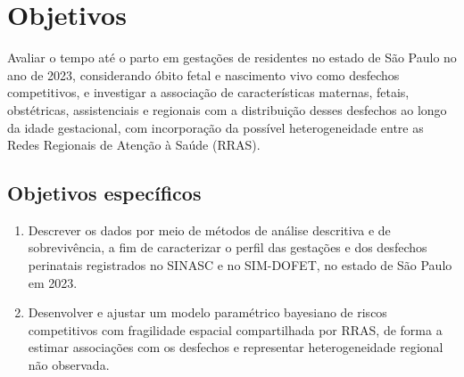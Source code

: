 \chapter{Objetivos}

Avaliar o tempo até o parto em gestações de residentes no estado de São Paulo no 
ano de 2023, considerando óbito fetal e nascimento vivo como desfechos 
competitivos, e investigar a associação de características maternas, fetais, 
obstétricas, assistenciais e regionais com a distribuição desses desfechos ao 
longo da idade gestacional, com incorporação da possível heterogeneidade entre as 
Redes Regionais de Atenção à Saúde (RRAS).

\section{Objetivos específicos}

\begin{enumerate}
    \item Descrever os dados por meio de métodos de análise descritiva e de 
    sobrevivência, a fim de caracterizar o perfil das gestações e dos desfechos 
    perinatais registrados no SINASC e no SIM-DOFET, no estado de São Paulo em 2023.

    \item Desenvolver e ajustar um modelo paramétrico bayesiano de riscos competitivos 
    com fragilidade espacial compartilhada por RRAS, de forma a estimar associações 
    com os desfechos e representar heterogeneidade regional não observada.
\end{enumerate}